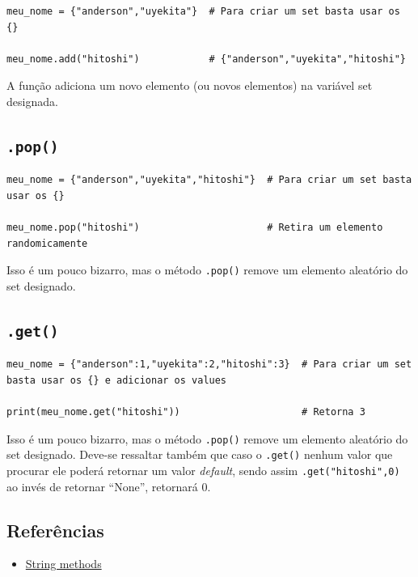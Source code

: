 \documentclass[]{book}
\providecommand{\tightlist}{%
  \setlength{\itemsep}{0pt}\setlength{\parskip}{0pt}}
\begin{document}
\begin{verbatim}
meu_nome = {"anderson","uyekita"}  # Para criar um set basta usar os {}

meu_nome.add("hitoshi")            # {"anderson","uyekita","hitoshi"}
\end{verbatim}

A função adiciona um novo elemento (ou novos elementos) na variável set
designada.

\subsection{\texorpdfstring{\texttt{.pop()}}{.pop()}}\label{pop}

\begin{verbatim}
meu_nome = {"anderson","uyekita","hitoshi"}  # Para criar um set basta usar os {}

meu_nome.pop("hitoshi")                      # Retira um elemento randomicamente
\end{verbatim}

Isso é um pouco bizarro, mas o método \texttt{.pop()} remove um elemento
aleatório do set designado.

\subsection{\texorpdfstring{\texttt{.get()}}{.get()}}\label{get}

\begin{verbatim}
meu_nome = {"anderson":1,"uyekita":2,"hitoshi":3}  # Para criar um set basta usar os {} e adicionar os values

print(meu_nome.get("hitoshi"))                     # Retorna 3
\end{verbatim}

Isso é um pouco bizarro, mas o método \texttt{.pop()} remove um elemento
aleatório do set designado. Deve-se ressaltar também que caso o
\texttt{.get()} nenhum valor que procurar ele poderá retornar um valor
\emph{default}, sendo assim \texttt{.get("hitoshi",0)} ao invés de
retornar ``None'', retornará 0.

\subsection{Referências}\label{referencias}

\begin{itemize}
\tightlist
\item
  \href{https://docs.python.org/3/library/stdtypes.html\#string-methods}{String
  methods}
\end{itemize}
\end{document}
